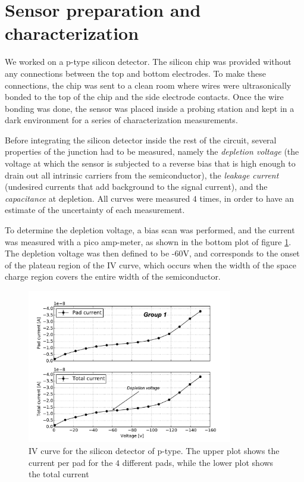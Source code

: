 \documentclass[12pt]{article}
\begin{document}
%
%

\section{Sensor preparation and characterization}

We worked on a p-type silicon detector. The silicon chip was provided without any connections between the top and bottom electrodes. To make these connections, the chip was sent to a clean room where wires were ultrasonically bonded to the top of the chip and the side electrode contacts. Once the wire bonding was done, the sensor was placed inside a probing station and kept in a dark environment for a series of characterization measurements.

Before integrating the silicon detector inside the rest of the circuit, several properties of the junction had to be measured, namely the \textit{depletion voltage} (the voltage at which the sensor is subjected to a reverse bias that is high enough to drain out all intrinsic carriers from the semiconductor), the \textit{leakage current} (undesired currents that add background to the signal current), and the \textit{capacitance} at depletion. All curves were measured $4$ times, in order to have an estimate of the uncertainty of each measurement.

To determine the depletion voltage, a bias scan was performed, and the current was measured with a pico amp-meter, as shown in the bottom plot of figure \ref{fig:IVcurve}. The depletion voltage was then defined to be -60V, and corresponds to the onset of the plateau region of the IV curve, which occurs when the width of the space charge region covers the entire width of the semiconductor.

\begin{figure}[H]
  \centering
  \includegraphics[width=0.8\textwidth]{./graphics/IV_V_vs_A.pdf}
  \caption{IV curve for the silicon detector of p-type. The upper plot shows the current per pad for the $4$ different pads, while the lower plot shows the total current }
  \label{fig:IVcurve}
\end{figure}
\end{document}
